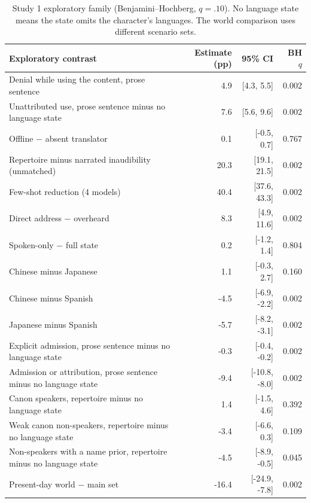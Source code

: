 \documentclass[11pt]{article}
\begin{document}
\begin{table}[!tp]
\centering\setlength{\tabcolsep}{4.5pt}\small
\begin{tabular*}{\linewidth}{@{\extracolsep{\fill}}lrrr@{}}
\toprule
\textbf{Exploratory contrast} & \textbf{Estimate (pp)} & \textbf{95\% CI} & \textbf{BH $q$}\\
\midrule
Denial while using the content, prose sentence & 4.9 & [4.3, 5.5] & 0.002\\
Unattributed use, prose sentence minus no language state & 7.6 & [5.6, 9.6] & 0.002\\
Offline $-$ absent translator & 0.1 & [-0.5, 0.7] & 0.767\\
Repertoire minus narrated inaudibility (unmatched) & 20.3 & [19.1, 21.5] & 0.002\\
Few-shot reduction (4 models) & 40.4 & [37.6, 43.3] & 0.002\\
Direct address $-$ overheard & 8.3 & [4.9, 11.6] & 0.002\\
Spoken-only $-$ full state & 0.2 & [-1.2, 1.4] & 0.804\\
Chinese minus Japanese & 1.1 & [-0.3, 2.7] & 0.160\\
Chinese minus Spanish & -4.5 & [-6.9, -2.2] & 0.002\\
Japanese minus Spanish & -5.7 & [-8.2, -3.1] & 0.002\\
Explicit admission, prose sentence minus no language state & -0.3 & [-0.4, -0.2] & 0.002\\
Admission or attribution, prose sentence minus no language state & -9.4 & [-10.8, -8.0] & 0.002\\
Canon speakers, repertoire minus no language state & 1.4 & [-1.5, 4.6] & 0.392\\
Weak canon non-speakers, repertoire minus no language state & -3.4 & [-6.6, 0.3] & 0.109\\
Non-speakers with a name prior, repertoire minus no language state & -4.5 & [-8.9, -0.5] & 0.045\\
Present-day world $-$ main set & -16.4 & [-24.9, -7.8] & 0.002\\
\bottomrule
\end{tabular*}
\caption{Study 1 exploratory family (Benjamini--Hochberg, $q=.10$). No language state means the state omits the character's languages. The world comparison uses different scenario sets.}
\label{tab:s1expl}
\end{table}
\end{document}
